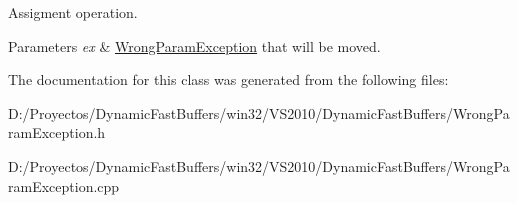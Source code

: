 Assigment operation. 


\begin{DoxyParams}{Parameters}
{\em ex} & \hyperlink{class_dynamic_fast_buffers_1_1_wrong_param_exception}{Wrong\-Param\-Exception} that will be moved. \\
\hline
\end{DoxyParams}


The documentation for this class was generated from the following files\-:\begin{DoxyCompactItemize}
\item 
D\-:/\-Proyectos/\-Dynamic\-Fast\-Buffers/win32/\-V\-S2010/\-Dynamic\-Fast\-Buffers/Wrong\-Param\-Exception.\-h\item 
D\-:/\-Proyectos/\-Dynamic\-Fast\-Buffers/win32/\-V\-S2010/\-Dynamic\-Fast\-Buffers/Wrong\-Param\-Exception.\-cpp\end{DoxyCompactItemize}
